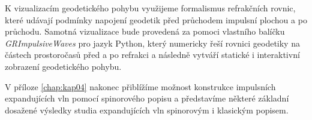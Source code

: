 K vizualizacím geodetického pohybu využijeme
formalismus refrakčních rovnic, které udávají podmínky napojení geodetik před průchodem impulsní plochou a po průchodu.
Samotná vizualizace bude provedená za pomoci vlastního balíčku \emph{GRImpulsiveWaves} pro jazyk Python, který numericky řeší rovnici geodetiky na
částech prostoročasů před a po refrakci a následně vytváří statické i interaktivní zobrazení geodetického pohybu.

V příloze \ref{chap:kap04} nakonec přiblížíme možnost konstrukce impulsních expandujících vln pomocí spinorového popisu a představíme některé základní
dosažené výsledky studia expandujících vln spinorovým i klasickým popisem.


\clearpage